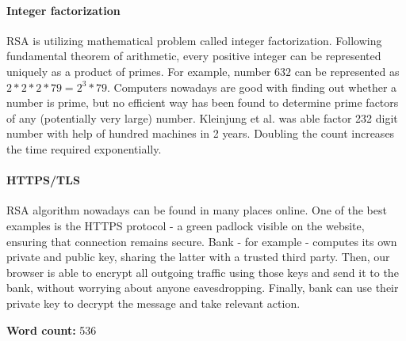 \documentclass[11pt]{article}
\begin{document}
\begin{multicols}{2}
\paragraph{Integer factorization}
RSA is utilizing mathematical problem called integer factorization. Following fundamental theorem of arithmetic, every positive integer can be represented uniquely as a product of primes. For example, number $632$ can be represented as $2*2*2*79 = 2^3 * 79$. Computers nowadays are good with finding out whether a number is prime, but no efficient way has been found to determine prime factors of any (potentially very large) number. Kleinjung et al. was able factor 232 digit number with help of hundred machines in 2 years.\cite{kleinjung2010factorization} Doubling the count increases the time required exponentially. 

\paragraph{HTTPS/TLS}
RSA algorithm nowadays can be found in many places online. One of the best examples is the HTTPS protocol - a green padlock visible on the website, ensuring that connection remains secure. Bank - for example - computes its own private and public key, sharing the latter with a trusted third party. Then, our browser is able to encrypt all outgoing traffic using those keys and send it to the bank, without worrying about anyone eavesdropping. Finally, bank can use their private key to decrypt the message and take relevant action.

\nocite{*}

\end{multicols}

\begin{figure}%
    \centering
    \qquad
    \label{fig:example}%
  \end{figure}




{\huge \textbf{Word count:} 536}
\end{document}
